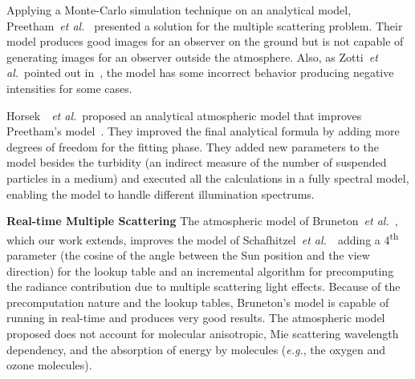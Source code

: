 \documentclass[journal]{vgtc}                %
\newcommand{\etal}{\emph{et al.}}
\newcommand{\review}[1]{{\color{blue}#1}}
\begin{document}
Applying a Monte-Carlo simulation technique on an analytical model, Preetham~\etal~\cite{Preetham:1999} presented a solution for the multiple scattering problem. Their model produces good images for an observer on the ground but is not capable of generating images for an observer outside the atmosphere. Also, as Zotti~\etal~pointed out in~\cite{Zotti:2007}, the model has some incorrect behavior producing negative intensities for some cases.

Horsek~\cite{Hosek:2012}~\etal~proposed an analytical atmospheric model that improves Preetham's model~\cite{Preetham:1999}. They improved the final analytical formula by adding more degrees of freedom for the fitting phase. They added new parameters to the model besides the turbidity (an indirect measure of the number of suspended particles in a medium) and executed all the calculations in a fully spectral model, enabling the model to handle different illumination spectrums.


\noindent \textbf{Real-time Multiple Scattering} \quad The atmospheric model of Bruneton~\etal~\cite{BrunetonNeyret:2008}, which our work extends, improves the model of Schafhitzel~\etal~\cite{Schafhitzel:2007}~adding a 4\textsuperscript{th} parameter (the cosine of the angle between the Sun position and the view direction) for the lookup table and an incremental algorithm for precomputing the radiance contribution due to multiple scattering light effects. Because of the precomputation nature and the lookup tables, Bruneton's model is capable of running in real-time and produces very good results. The atmospheric model proposed does not account for molecular anisotropic, Mie scattering wavelength dependency, and the absorption of energy by molecules (\textit{e.g.}, the oxygen and ozone molecules).
\end{document}
